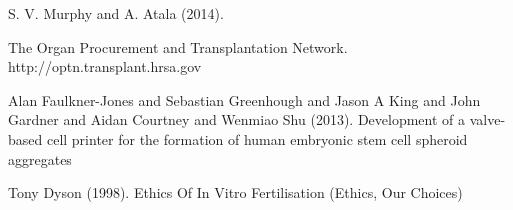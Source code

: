 \documentclass[12pt]{article} %
\begin{document}
\begin{thebibliography}{99} %

\newblock S. V. Murphy and A. Atala (2014).

\newblock The Organ Procurement and Transplantation Network.
\newblock http://optn.transplant.hrsa.gov

\newblock Alan Faulkner-Jones and Sebastian Greenhough and Jason A King and John Gardner and Aidan Courtney and Wenmiao Shu (2013).
\newblock Development of a valve-based cell printer for the formation of human embryonic stem cell spheroid aggregates

\newblock Tony Dyson (1998).
\newblock Ethics Of In Vitro Fertilisation (Ethics, Our Choices)


\end{thebibliography}

\end{document}
